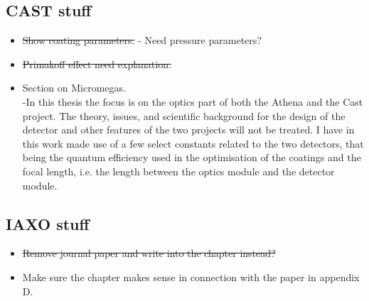 \subsection{CAST stuff}
\begin{itemize}
  \item \st{ Show coating parameters.}
      - Need pressure parameters?
  \item \st{Primakoff effect need explanation.}
  \item Section on Micromegas.\\
      -In this thesis the focus is on the optics part of both the Athena and the Cast project. The theory, issues, and scientific background for the design of the detector and other features of the two projects will not be treated. I have in this work made use of a few select constants related to the two detectors, that being the quantum efficiency used in the optimisation of the coatings and the focal length, i.e. the length between the optics module and the detector module.
\end{itemize}

\subsection{IAXO stuff}
\begin{itemize}
  \item \st{ Remove journal paper and write into the chapter instead?}
  \item Make sure the chapter makes sense in connection with the paper in appendix D.
\end{itemize}
